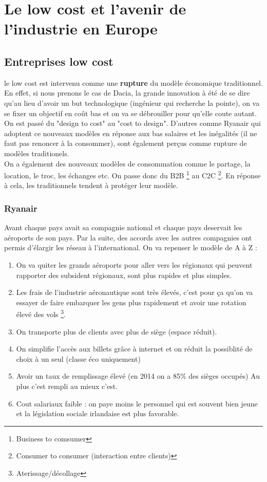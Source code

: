 
\chapter{Le low cost et l'avenir de l'industrie en Europe}
\section{Entreprises low cost}
le low cost est intervenu comme une \textbf{rupture} du modèle économique traditionnel. En effet, si nous prenons le cas de Dacia, la grande innovation à été de se dire qu’au lieu d’avoir un but technologique (ingénieur qui recherche la pointe), on va se fixer un objectif en coût bas et on va se débrouiller pour qu’elle coute autant. On est passé du "design to cost" au "cost to design". D'autres comme Ryanair qui adoptent ce nouveaux modèles en réponse aux bas salaires et les inégalités (il ne faut pas renoncer à la consommer), sont également perçus comme rupture de modèles traditionels. \\
On a également des nouveaux modèles de consommation comme le partage, la location, le troc, les échanges etc. On passe donc du B2B \footnote{Business to comsumer} au C2C \footnote{Consumer to consumer (interaction entre clients)}. En réponse à cela, les traditionnels tendent à protéger leur modèle. 

\subsection{Ryanair}
Avant chaque pays avait sa compagnie national et chaque pays deservait les aéroports de son pays. Par la suite, des accords avec les autres compagnies ont permis d'élargir les réseau à l'international.
On va repenser le modèle de A à Z :
\begin{enumerate}
	\item On va quiter les grands aéroports pour aller vers les régionaux qui peuvent rapporter des subsident régionaux, sont plus rapides et plus simples.
	
	\item Les frais de l’industrie aéronautique sont très élevés, c’est pour ça qu’on va essayer de faire embarquer les gens plus rapidement et avoir une rotation élevé des vols \footnote{Aterissage/décollage}.
	
	\item On transporte plus de clients avec plus de siège (espace réduit).
	
	\item On simplifie l’accès aux billets grâce à internet et on réduit la possiblité de choix à un seul (classe éco uniquement)
	
	\item Avoir un taux de remplissage élevé (en 2014 on a 85\% des sièges occupés) Au plus c’est rempli au mieux c’est.
	
	\item Cout salariaux faible : on paye moins le personnel qui est souvent bien jeune et la législation sociale irlandaise est plus favorable.
\end{enumerate}

